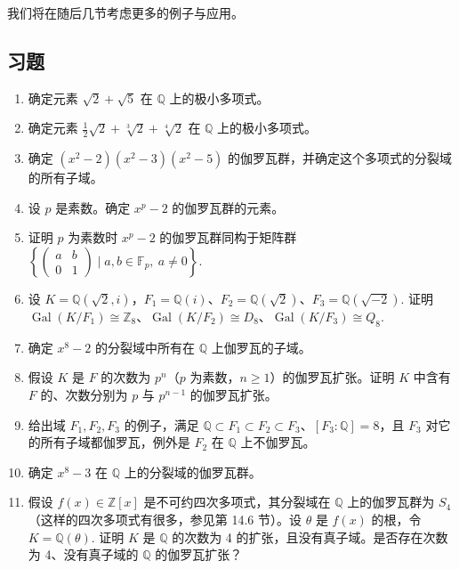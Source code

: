 我们将在随后几节考虑更多的例子与应用。

\subsection*{习题}

\begin{enumerate}
\item 确定元素 \(\sqrt{2}+\sqrt{5}\) 在 \(\mathbb{Q}\) 上的极小多项式。

\item 确定元素 \(\frac{1}{2}\sqrt{2}+\sqrt[3]{2}+\sqrt[4]{2}\) 在 \(\mathbb{Q}\) 上的极小多项式。

\item 确定 \((x^2-2)(x^2-3)(x^2-5)\) 的伽罗瓦群，并确定这个多项式的分裂域的所有子域。

\item 设 \(p\) 是素数。确定 \(x^p-2\) 的伽罗瓦群的元素。

\item 证明 \(p\) 为素数时 \(x^p-2\) 的伽罗瓦群同构于矩阵群 \(\left\{\begin{pmatrix} a & b \\ 0 & 1 \end{pmatrix} \mid a, b \in \mathbb{F}_p,\ a \neq 0\right\}\).

\item 设 \(K = \mathbb{Q}(\sqrt{2}, i)\)，\(F_1 = \mathbb{Q}(i)\)、\(F_2 = \mathbb{Q}(\sqrt{2})\)、\(F_3 = \mathbb{Q}(\sqrt{-2})\). 证明 \(\operatorname{Gal}(K/F_1) \cong \mathbb{Z}_8\)、\(\operatorname{Gal}(K/F_2) \cong D_8\)、\(\operatorname{Gal}(K/F_3) \cong Q_8\).

\item 确定 \(x^8-2\) 的分裂域中所有在 \(\mathbb{Q}\) 上伽罗瓦的子域。

\item 假设 \(K\) 是 \(F\) 的次数为 \(p^n\)（\(p\) 为素数，\(n \geq 1\)）的伽罗瓦扩张。证明 \(K\) 中含有 \(F\) 的、次数分别为 \(p\) 与 \(p^{n-1}\) 的伽罗瓦扩张。

\item 给出域 \(F_1, F_2, F_3\) 的例子，满足 \(\mathbb{Q} \subset F_1 \subset F_2 \subset F_3\)、\([F_3:\mathbb{Q}] = 8\)，且 \(F_3\) 对它的所有子域都伽罗瓦，例外是 \(F_2\) 在 \(\mathbb{Q}\) 上不伽罗瓦。

\item 确定 \(x^8-3\) 在 \(\mathbb{Q}\) 上的分裂域的伽罗瓦群。

\item 假设 \(f(x) \in \mathbb{Z}[x]\) 是不可约四次多项式，其分裂域在 \(\mathbb{Q}\) 上的伽罗瓦群为 \(S_4\)（这样的四次多项式有很多，参见第 14.6 节）。设 \(\theta\) 是 \(f(x)\) 的根，令 \(K = \mathbb{Q}(\theta)\). 证明 \(K\) 是 \(\mathbb{Q}\) 的次数为 4 的扩张，且没有真子域。是否存在次数为 4、没有真子域的 \(\mathbb{Q}\) 的伽罗瓦扩张？


\end{enumerate}
